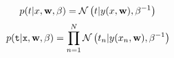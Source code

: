 $$p(t|x,{\bf w},\beta)={\cal N}\left( t|y(x,{\bf w}), \beta^{-1} \right)$$
$$p({\tt t}|{\tt x}, {\bf w}, \beta)=\prod_{n=1}^{N}{\cal N}\left( t_n | y(x_n , {\bf w}), \beta^{-1}\right)$$
